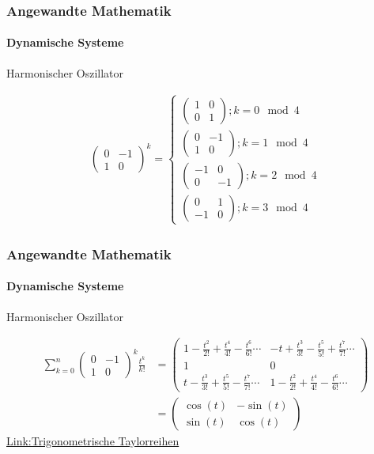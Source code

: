 \documentclass{beamer}
\begin{document}
 \begin{frame}
    \frametitle{Angewandte Mathematik}
\framesubtitle{Dynamische Systeme }
\begin{block}{Harmonischer Oszillator}

\begin{align*}
\begin{pmatrix}
        0 & -1  \\ 1 & 0
    \end{pmatrix}^{k}  = \begin{cases} 
        \begin{pmatrix}
            1 & 0  \\ 0 & 1
        \end{pmatrix}; k = 0 \mod 4 \\
        \begin{pmatrix}
            0 & -1  \\ 1 & 0
        \end{pmatrix}; k = 1 \mod 4 \\
        \begin{pmatrix}
            -1 & 0  \\ 0 & -1
        \end{pmatrix}; k = 2 \mod 4 \\
        \begin{pmatrix}
            0 & 1  \\ -1 & 0
        \end{pmatrix}; k = 3 \mod 4
    \end{cases}
\end{align*}
\end{block}
 \end{frame}

 \begin{frame}
    \frametitle{Angewandte Mathematik}
\framesubtitle{Dynamische Systeme }
\begin{block}{Harmonischer Oszillator}

\begin{align*}
\sum_{k= 0}^{n} \begin{pmatrix}
    0 & -1  \\ 1 & 0
\end{pmatrix}^{k} \frac{t^k}{k!} & =
\begin{pmatrix}
    1-\frac{t^2}{2!} + \frac{t^4}{4!}-\frac{t^6}{6!} \cdots & -t +\frac{t^3}{3!} - \frac{t^5}{5!} +\frac{t^7}{7!} \cdots  \\ 1 & 0 \\
    t -\frac{t^3}{3!} + \frac{t^5}{5!} -\frac{t^7}{7!} \cdots  & 1-\frac{t^2}{2!} + \frac{t^4}{4!}-\frac{t^6}{6!}  \cdots
\end{pmatrix} \\
&= \begin{pmatrix}
    \cos(t) & -\sin(t)  \\ \sin(t) & \cos(t)
\end{pmatrix}
\end{align*}
\href{https://de.wikipedia.org/wiki/Taylorreihe}{Link:Trigonometrische Taylorreihen}
\end{block}
 \end{frame}
\end{document}
